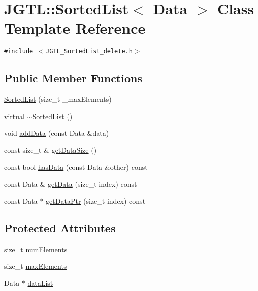 \hypertarget{class_j_g_t_l_1_1_sorted_list}{
\section{JGTL::Sorted\-List$<$ Data $>$ Class Template Reference}
\label{class_j_g_t_l_1_1_sorted_list}
}
{\tt \#include $<$JGTL\_\-Sorted\-List\_\-delete.h$>$}

\subsection*{Public Member Functions}
\begin{CompactItemize}
\item 
\hyperlink{class_j_g_t_l_1_1_sorted_list_1aeb5755a4b248591c707fcb1ff27052}{Sorted\-List} (size\_\-t \_\-max\-Elements)
\item 
virtual \hyperlink{class_j_g_t_l_1_1_sorted_list_a8556bcb4bec9a7819f673792c3bc03f}{$\sim$Sorted\-List} ()
\item 
void \hyperlink{class_j_g_t_l_1_1_sorted_list_374a692e9fc1fe007d2c3d7471731fc1}{add\-Data} (const Data \&data)
\item 
const size\_\-t \& \hyperlink{class_j_g_t_l_1_1_sorted_list_a91c989bf22b3ac5d25c00f5a36389c5}{get\-Data\-Size} ()
\item 
const bool \hyperlink{class_j_g_t_l_1_1_sorted_list_8acf88bdfe7f74a11e4c2dc945ec165d}{has\-Data} (const Data \&other) const 
\item 
const Data \& \hyperlink{class_j_g_t_l_1_1_sorted_list_2c2b54845e1d3fb62c70e2a60c322b35}{get\-Data} (size\_\-t index) const
\item 
const Data $\ast$ \hyperlink{class_j_g_t_l_1_1_sorted_list_c5d2b01457f3769e028afd5343685082}{get\-Data\-Ptr} (size\_\-t index) const
\end{CompactItemize}
\subsection*{Protected Attributes}
\begin{CompactItemize}
\item 
size\_\-t \hyperlink{class_j_g_t_l_1_1_sorted_list_69b46609908f5d677486ed01749ce515}{num\-Elements}
\item 
size\_\-t \hyperlink{class_j_g_t_l_1_1_sorted_list_263ce05febec35a732661d2c26acb3a3}{max\-Elements}
\item 
Data $\ast$ \hyperlink{class_j_g_t_l_1_1_sorted_list_8315e6bbcf773663fd19c5e369a78b2f}{data\-List}
\end{CompactItemize}
